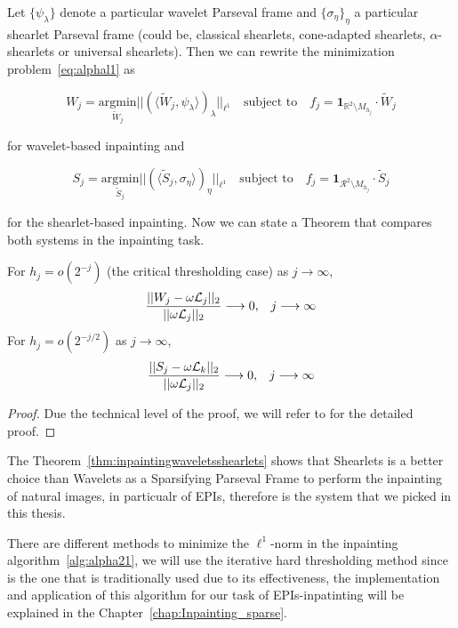 Let $\{\psi_{\lambda}\}$ denote a particular wavelet Parseval frame and $\{ \sigma_{\eta}\}_{\eta}$ a particular shearlet Parseval frame (could be, classical shearlets, cone-adapted shearlets, $\alpha$-shearlets or universal shearlets). Then we can rewrite the minimization problem~\ref{eq:alphal1} as

$$
W_j=\underset{\tilde{W}_j}{\textrm{argmin}}||(\langle \tilde{W}_j,\psi_{\lambda}\rangle )_{\lambda}||_{\ell^1}\quad\textrm{subject to}\quad f_j=\mathbf{1}_{\mathbb{R}^2\setminus M_{h_j}}\cdot\tilde{W}_j
$$ 

for wavelet-based inpainting and 

$$
S_j=\underset{\tilde{S}_j}{\textrm{argmin}}||(\langle \tilde{S}_j,\sigma_{\eta}\rangle)_{\eta}||_{\ell^1}\quad \textrm{subject to}\quad f_j=\mathbf{1}_{\mathcal{R}^2\setminus M_{h_j}}\cdot\tilde{S}_j
$$

for the shearlet-based inpainting. Now we can state a Theorem that compares both systems in the inpainting task.

\begin{thm}
\label{thm:inpaintingwaveletsshearlets}
For $h_j=o(2^{-j})$ (the critical thresholding case) as $j\longrightarrow \infty$,
$$
\frac{||W_j-\omega\mathcal{L}_j||_2}{||\omega\mathcal{L}_j||_2}\longrightarrow 0\textrm{,}\quad j\longrightarrow \infty\\
$$ 
For $h_j=o(2^{-j/2})$ as $j\longrightarrow\infty$,
$$
\frac{||S_j-\omega\mathcal{L}_k||_2}{||\omega\mathcal{L}_j||_2}\longrightarrow 0\textrm{,}\quad j\longrightarrow\infty\\
$$
\end{thm}
\begin{proof}
Due the technical level of the proof, we will refer to \cite{clustered-inpainting} for the detailed proof. 
\end{proof}

The Theorem~\ref{thm:inpaintingwaveletsshearlets} shows that Shearlets is a better choice than Wavelets as a Sparsifying  Parseval Frame to perform the inpainting of natural images, in particualr of EPIs, therefore is the system that we picked in this thesis.

\bigskip

There are different methods to minimize the $\ell^1$-norm in the inpainting algorithm~\ref{alg:alpha21}, we will use the iterative hard thresholding method since is the one that is traditionally used due to its effectiveness, the implementation and application of this algorithm for our task of EPIs-inpatinting will be explained in the Chapter~\ref{chap:Inpainting_sparse}.

